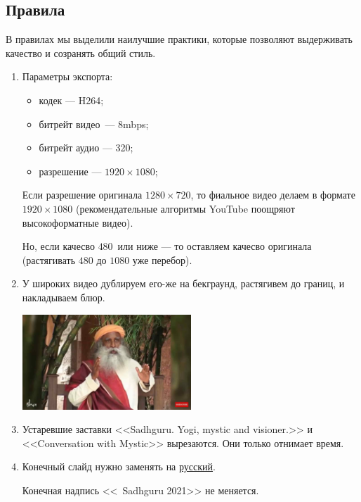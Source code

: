 \documentclass[
a4paper, %
12pt, %
article,
onecolumn, %
openany, %
]{memoir}
\begin{document}
\subsection{Правила}
В правилах мы выделили наилучшие практики, которые позволяют выдерживать качество и созранять общий стиль.
\begin{enumerate}
\item Параметры экспорта:
    \begin{itemize}
    \item кодек --- H264;
    \item битрейт видео~--- 8mbps;
    \item битрейт аудио --- 320;
    \item разрешение --- $1920 \times 1080$;
    \end{itemize}

    Если разрешение оригинала $1280 \times 720$,
        то фиальное видео делаем в формате
    $1920 \times 1080$ {\color{gray}(рекомендательные алгоритмы 
        YouTube поощряют 
    высокоформатные видео)}. 

    Но, если качесво $480$\ или ниже --- то оставляем 
    качесво оригинала {\color{gray}(растягивать $480$ до $1080$ уже перебор)}.


\item У широких видео дублируем его-же на бекграунд, растягивем до границ, и накладываем блюр.

	\begin{center} \includegraphics[width=0.5\textwidth]{tooWide} \end{center}

\item Устаревшие заставки <<Sadhguru. Yogi, mystic and visioner.>> и <<Conversation with Mystic>> вырезаются. {\color{gray}Они только отнимает время.}

\item Конечный слайд нужно заменять на \href{https://drive.google.com/file/d/11NbSgvq8LbxDcy-a2WY5OJTKUZKcZx88/view?usp=sharing}{русский}. 

	Конечная надпись <<\textcopyright\ Sadhguru 2021>> не меняется.


\end{enumerate}
\end{document}
